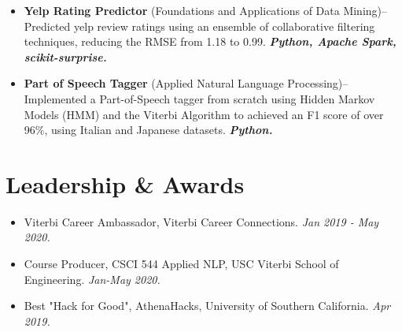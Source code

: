 \documentclass[letterpaper,10pt]{article}
\newcommand{\pro}[4]{
    \item \textbf{#1} {#2}--{#3} \textbf{\textit{#4}}
}
\newcommand{\prowlink}[4]{
    \item \href{#2}{\textbf{#1}}--{#3} \textbf{\textit{#4}}
}
\newcommand{\activity}[2]{
    \item #1 \emph{#2}
}
\newcommand{\bulletsBegin}{
    \vspace{1pt}
    \begin{minipage}{17.6cm}
    \begin{itemize}[leftmargin=0.6cm]
    \setlength\itemsep{-0.1em}
}
\newcommand{\bulletsEnd}{
    \end{itemize}\vspace{0pt}
    \end{minipage}
}
\begin{document}
        \bulletsBegin
            \vspace{-3pt}
        \pro{Yelp Rating Predictor}{(Foundations and Applications of Data Mining)}
            {Predicted yelp review ratings using an ensemble of collaborative filtering techniques, reducing the RMSE from 1.18 to 0.99.}
            {Python, Apache Spark, scikit-surprise.}
        \pro{Part of Speech Tagger}{(Applied Natural Language Processing)}
            {Implemented a Part-of-Speech tagger from scratch using Hidden Markov Models (HMM) and the Viterbi Algorithm to achieved an F1 score of over 96\%, using Italian and Japanese datasets.}
            {Python.}
        
        \bulletsEnd

    
    \section{Leadership \& Awards}

    \bulletsBegin
        \activity{Viterbi Career Ambassador, Viterbi Career Connections.}
        {Jan 2019 - May 2020.}
        \vspace{-3pt}
        \activity{Course Producer, CSCI 544 Applied NLP, USC Viterbi School of Engineering.}
        {Jan-May 2020.}
        \vspace{-3pt}
        \activity{Best "Hack for Good", AthenaHacks, University of Southern California.}
        {Apr 2019.}
        \vspace{-2pt}
    \bulletsEnd

\end{document}
